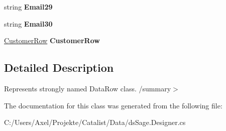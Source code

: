 \begin{DoxyCompactItemize}
\item 
string {\bfseries Email29}\hypertarget{class_products_1_1_data_1_1ds_sage_1_1kontaktemail_row_aa96a936a8acce6a4ff4cef82717af7ad}{}\label{class_products_1_1_data_1_1ds_sage_1_1kontaktemail_row_aa96a936a8acce6a4ff4cef82717af7ad}

\item 
string {\bfseries Email30}\hypertarget{class_products_1_1_data_1_1ds_sage_1_1kontaktemail_row_af7196b4266fcc5d4754d75ff1168deb3}{}\label{class_products_1_1_data_1_1ds_sage_1_1kontaktemail_row_af7196b4266fcc5d4754d75ff1168deb3}

\item 
\hyperlink{class_products_1_1_data_1_1ds_sage_1_1_customer_row}{Customer\+Row} {\bfseries Customer\+Row}\hypertarget{class_products_1_1_data_1_1ds_sage_1_1kontaktemail_row_a9c813e0d4691a0374304b26e51bec72c}{}\label{class_products_1_1_data_1_1ds_sage_1_1kontaktemail_row_a9c813e0d4691a0374304b26e51bec72c}

\end{DoxyCompactItemize}


\subsection{Detailed Description}
Represents strongly named Data\+Row class. /summary$>$ 

The documentation for this class was generated from the following file\+:\begin{DoxyCompactItemize}
\item 
C\+:/\+Users/\+Axel/\+Projekte/\+Catalist/\+Data/ds\+Sage.\+Designer.\+cs\end{DoxyCompactItemize}
